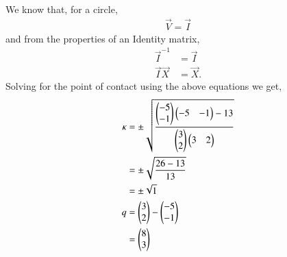 \documentclass[journal,12pt,twocolumn]{IEEEtran}
\begin{document}
We know that, for a circle, 
\begin{align}
\vec{V} = \vec{I} \label{eq10}  
\end{align}
and from the properties of an Identity matrix, 
\begin{align}
\vec{I}^{-1} &= \vec{I} \label{eq11} \\
\vec{I}\vec{X} &= \vec{X} \label{eq12}.  
\end{align}
Solving for the point of contact using the above equations we get,
\begin{align}
\kappa &= \pm \sqrt{\frac{\begin{pmatrix} -5 \\ -1 \end{pmatrix}\begin{pmatrix}-5 & -1\end{pmatrix} - 13}{\begin{pmatrix}3 \\2 \end{pmatrix}\begin{pmatrix}3 &2 \end{pmatrix}}} \\
&= \pm \sqrt{\frac{26 - 13}{13}} \\
& =  \pm \sqrt{1} \\
q &= \begin{pmatrix}3 \\2 \end{pmatrix} - \begin{pmatrix}-5 \\ -1\end{pmatrix} \\
&= \begin{pmatrix}8 \\ 3\end{pmatrix}
\end{align}
\end{document}
